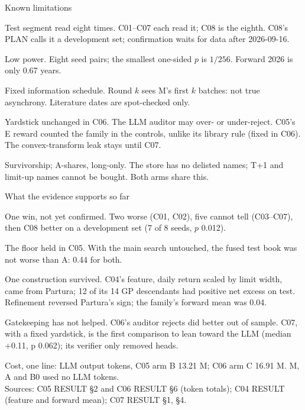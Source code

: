 \documentclass[t,20pt]{beamer}
\newcommand\notesize{\fontsize{14}{17}\selectfont\hyphenpenalty=10000\exhyphenpenalty=10000}
\newcommand\key[1]{{\mediumfont\color{accent}#1}}
\newcommand\lead[1]{{\mediumfont #1}}
\newenvironment{blist}{%
  \begin{list}{\textcolor{sec}{\textbullet}}{\def\makelabel##1{##1\hfil}%
    \setlength\leftmargin{0.34in}\setlength\labelwidth{0.2in}\setlength\labelsep{0.14in}%
    \setlength\itemsep{16pt}\setlength\parsep{0pt}\setlength\topsep{0pt}\setlength\partopsep{0pt}%
    \setlength\itemindent{0pt}\setlength\listparindent{0pt}\setlength\rightmargin{0pt}}}%
  {\end{list}}
\newcounter{nl}
\newenvironment{nlist}{%
  \begin{list}{\textcolor{sec}{\arabic{nl}}}{\usecounter{nl}\def\makelabel##1{##1\hfil}%
    \setlength\leftmargin{0.40in}\setlength\labelwidth{0.26in}\setlength\labelsep{0.14in}%
    \setlength\itemsep{26pt}\setlength\parsep{0pt}\setlength\topsep{0pt}\setlength\partopsep{0pt}%
    \setlength\itemindent{0pt}\setlength\listparindent{0pt}\setlength\rightmargin{0pt}}}%
  {\end{list}}
\newcommand\gap[1]{\par\vspace{#1}}
\newcommand\textfirst{\vspace*{-0.14in}}
\begin{document}
\begin{frame}{Known limitations}
\textfirst
\begin{blist}
  \item \lead{Test segment read eight times.} C01–C07 each read it; C08 is the eighth. C08's PLAN calls it a development set; confirmation waits for data after 2026-09-16.
  \item \lead{Low power.} Eight seed pairs; the smallest one-sided $p$ is $1/256$. Forward 2026 is only 0.67 years.
  \item \lead{Fixed information schedule.} Round $k$ sees M's first $k$ batches: not true asynchrony. Literature dates are spot-checked only.
  \item \lead{Yardstick unchanged in C06.} The LLM auditor may over- or under-reject. C05's E reward counted the family in the controls, unlike its library rule (fixed in C06). The convex-transform leak stays until C07.
  \item \lead{Survivorship; A-shares, long-only.} The store has no delisted names; T+1 and limit-up names cannot be bought. Both arms share this.
\end{blist}
\end{frame}

\begin{frame}{What the evidence supports so far}
\textfirst
\begin{nlist}\setlength\itemsep{18pt}
  \item \lead{One win, not yet confirmed.} Two \key{worse} (C01, C02), five \key{cannot tell} (C03–C07), then C08 \key{better} on a development set (7 of 8 seeds, $p$ 0.012).
  \item \lead{The floor held in C05.} With the main search untouched, the fused test book was not worse than A: 0.44 for both.
  \item \lead{One construction survived.} C04's feature, daily return scaled by limit width, came from Partura; 12 of its 14 GP descendants had positive net excess on test. Refinement reversed Partura's sign; the family's forward mean was 0.04.
  \item \lead{Gatekeeping has not helped.} C06's auditor rejects did better out of sample. C07, with a fixed yardstick, is the \key{first} comparison to lean toward the LLM (median +0.11, p 0.062); its verifier only removed heads.
\end{nlist}
\gap{0.14in}
{\notesize\color{sec}Cost, one line: LLM output tokens, C05 arm B 13.21 M; C06 arm C 16.91 M. M, A and B0 used no LLM tokens.\\
Sources: C05 RESULT §2 and C06 RESULT §6 (token totals); C04 RESULT (feature and forward mean); C07 RESULT §1, §4.\par}
\end{frame}
\end{document}
